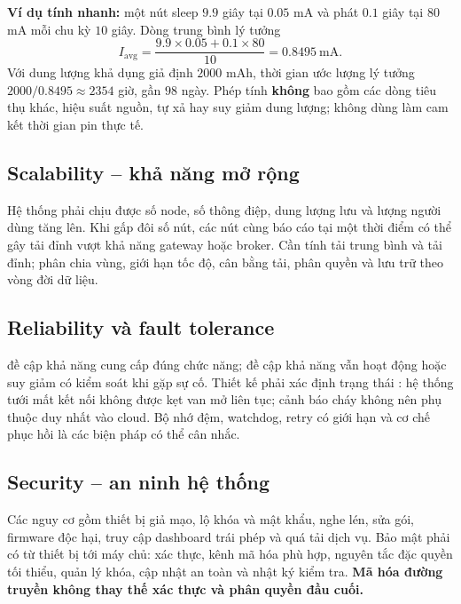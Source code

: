 \begin{expandbox}
\textbf{Ví dụ tính nhanh:} một nút sleep $9.9$ giây tại $0.05$ mA và phát $0.1$ giây tại $80$ mA mỗi chu kỳ $10$ giây. Dòng trung bình lý tưởng
\[I_\mathrm{avg}=\frac{9.9\times0.05+0.1\times80}{10}=0.8495\ \mathrm{mA}.\]
Với dung lượng khả dụng giả định $2000$ mAh, thời gian ước lượng lý tưởng $2000/0.8495\approx 2354$ giờ, gần $98$ ngày. Phép tính \textbf{không} bao gồm các dòng tiêu thụ khác, hiệu suất nguồn, tự xả hay suy giảm dung lượng; không dùng làm cam kết thời gian pin thực tế.
\end{expandbox}

\subsection{Scalability -- khả năng mở rộng}
Hệ thống phải chịu được số node, số thông điệp, dung lượng lưu và lượng người dùng tăng lên. Khi gấp đôi số nút, các nút cùng báo cáo tại một thời điểm có thể gây tải đỉnh vượt khả năng gateway hoặc broker. Cần tính tải trung bình và tải đỉnh; phân chia vùng, giới hạn tốc độ, cân bằng tải, phân quyền và lưu trữ theo vòng đời dữ liệu.
\subsection{Reliability và fault tolerance}
 đề cập khả năng cung cấp đúng chức năng;  đề cập khả năng vẫn hoạt động hoặc suy giảm có kiểm soát khi gặp sự cố. Thiết kế phải xác định trạng thái : hệ thống tưới mất kết nối không được kẹt van mở liên tục; cảnh báo cháy không nên phụ thuộc duy nhất vào cloud. Bộ nhớ đệm, watchdog, retry có giới hạn và cơ chế phục hồi là các biện pháp có thể cân nhắc.
\subsection{Security -- an ninh hệ thống}
Các nguy cơ gồm thiết bị giả mạo, lộ khóa và mật khẩu, nghe lén, sửa gói, firmware độc hại, truy cập dashboard trái phép và quá tải dịch vụ. Bảo mật phải có từ thiết bị tới máy chủ: xác thực, kênh mã hóa phù hợp, nguyên tắc đặc quyền tối thiểu, quản lý khóa, cập nhật an toàn và nhật ký kiểm tra. \textbf{Mã hóa đường truyền không thay thế xác thực và phân quyền đầu cuối.}

